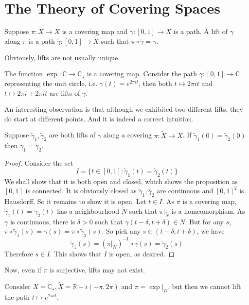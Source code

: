 \section{The Theory of Covering Spaces}
\begin{definition}
    Suppose $\pi:\tilde{X}\to X$ is a covering map and $\gamma:[0,1]\to X$ is a path.
    A lift of $\gamma$ along $\pi$ is a path $\tilde{\gamma}:[0,1]\to\tilde{X}$ such that $\pi\circ\tilde{\gamma}=\gamma$.
\end{definition}
Obviously, lifts are not usually unique.
\begin{example}
    The function $\exp:\mathbb C\to\mathbb C_\star$ is a covering map.
    Consider the path $\gamma:[0,1]\to \mathbb C$ representing the unit circle, i.e. $\gamma(t)=e^{2\pi it}$, then both $t\mapsto 2\pi it$ and $t\mapsto 2\pi i+2\pi it$ are lifts of $\gamma$.
\end{example}
An interesting observation is that although we exhibited two different lifts, they do start at different points.
And it is indeed a correct intuition.
\begin{proposition}
    Suppose $\tilde{\gamma}_1,\tilde{\gamma}_2$ are both lifts of $\gamma$ along a covering $\pi:\tilde{X}\to X$.
    If $\tilde{\gamma}_1(0)=\tilde{\gamma}_2(0)$ then $\tilde{\gamma}_1=\tilde{\gamma}_2$.
\end{proposition}
\begin{proof}
    Consider the set
    $$I=\{t\in[0,1]:\tilde{\gamma}_1(t)=\tilde{\gamma}_2(t)\}$$
    We shall show that it is both open and closed, which shows the proposition as $[0,1]$ is connected.
    It is obviously closed as $\tilde{\gamma}_1,\tilde{\gamma}_2$ are continuous and $[0,1]^2$ is Hausdorff.
    So it remains to show it is open.
    Let $t\in I$.
    As $\pi$ is a covering map, $\tilde{\gamma}_1(t)=\tilde{\gamma}_2(t)$ has a neighbourhood $\tilde{N}$ such that $\pi|_{\tilde{N}}$ is a homeomorphism.
    As $\gamma$ is continuous, there is $\delta>0$ such that $\gamma(t-\delta,t+\delta)\in N$.
    But for any $s$, $\pi\circ\tilde{\gamma}_1(s)=\gamma(s)=\pi\circ\tilde{\gamma}_2(s)$.
    So pick any $s\in (t-\delta,t+\delta)$, we have
    $$\tilde{\gamma}_1(s)=(\pi|_{\tilde{N}})^{-1}\circ\gamma(s)=\tilde{\gamma}_2(s)$$
    Therefore $s\in I$.
    This shows that $I$ is open, as desired.
\end{proof}
Now, even if $\pi$ is surjective, lifts may not exist.
\begin{example}[Counterexample]
    Consider $X=\mathbb C_\star,\tilde{X}=\mathbb R+i(-\pi,2\pi)$ and $\pi=\exp|_D$, but then we cannot lift the path $t\mapsto e^{2\pi it}$.
\end{example}

